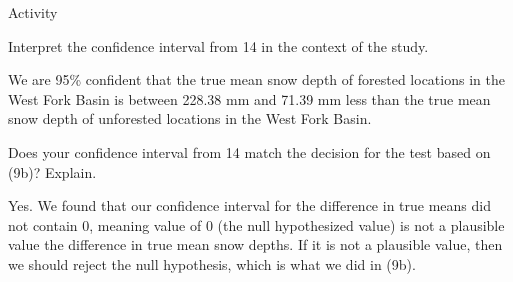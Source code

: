 \documentclass[12pt]{article}\usepackage[]{graphicx}\usepackage[]{color}
\makeatletter
\newcommand{\hlnum}[1]{\textcolor[rgb]{0,0,0}{#1}}%
\newcommand{\hlcom}[1]{\textcolor[rgb]{0.4,0.4,0.4}{\textit{#1}}}%
\newcommand{\hlopt}[1]{\textcolor[rgb]{0,0,0}{\textbf{#1}}}%
\newcommand{\hlstd}[1]{\textcolor[rgb]{0,0,0}{#1}}%
\newcommand{\hlkwa}[1]{\textcolor[rgb]{0,0,0}{\textbf{#1}}}%
\newcommand{\hlkwb}[1]{\textcolor[rgb]{0,0,0}{\textbf{#1}}}%
\newcommand{\hlkwc}[1]{\textcolor[rgb]{0,0,0}{\textbf{#1}}}%
\newcommand{\hlkwd}[1]{\textcolor[rgb]{0,0,0}{\textbf{#1}}}%
\newenvironment{kframe}{%
 \def\at@end@of@kframe{}%
 \ifinner\ifhmode%
  \def\at@end@of@kframe{\end{minipage}}%
  \begin{minipage}{\columnwidth}%
 \fi\fi%
 \def\FrameCommand##1{\hskip\@totalleftmargin \hskip-\fboxsep
 \colorbox{shadecolor}{##1}\hskip-\fboxsep
     \hskip-\linewidth \hskip-\@totalleftmargin \hskip\columnwidth}%
 \MakeFramed {\advance\hsize-\width
   \@totalleftmargin\z@ \linewidth\hsize
   \@setminipage}}%
 {\par\unskip\endMakeFramed%
 \at@end@of@kframe}
\newenvironment{knitrout}{}{} %
\renewenvironment{knitrout}{\begin{footnotesize}}{\end{footnotesize}}
\makeatother
\begin{document}
\begin{exam}{Activity}


\begin{problem}
Interpret the confidence interval from 14 in the context of the study.
\begin{solution}[2cm]
We are 95\% confident that the true mean snow depth of forested locations in the West Fork Basin is between 228.38 mm and 71.39 mm less than the true mean snow depth of unforested locations in the West Fork Basin.
\end{solution}
\end{problem}


\begin{problem}
Does your confidence interval from 14 match the decision for the test based on (9b)? Explain.
\begin{solution}[2cm]
Yes. We found that our confidence interval for the difference in true means did not contain 0, meaning value of 0 (the null hypothesized value) is not a plausible value the difference in true mean snow depths. If it is not a plausible value, then we should reject the null hypothesis, which is what we did in (9b).
\end{solution}
\end{problem}






\end{exam}
\end{document}
